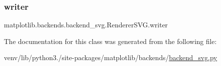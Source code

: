\mbox{\label{classmatplotlib_1_1backends_1_1backend__svg_1_1RendererSVG_af8f8862c6e64f24d8edb3f312253b776}} 
\subsubsection{\texorpdfstring{writer}{writer}}
{\footnotesize\ttfamily matplotlib.\+backends.\+backend\+\_\+svg.\+Renderer\+S\+V\+G.\+writer}



The documentation for this class was generated from the following file\+:\begin{DoxyCompactItemize}
\item 
venv/lib/python3./site-\/packages/matplotlib/backends/\hyperlink{backend__svg_8py}{backend\+\_\+svg.\+py}\end{DoxyCompactItemize}
